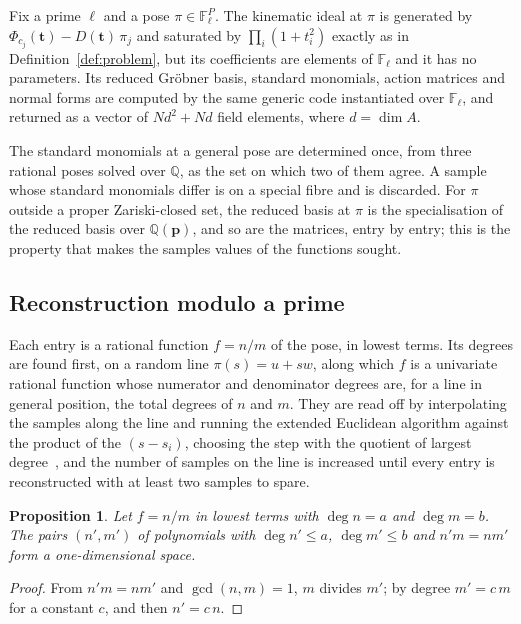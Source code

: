 \documentclass[11pt,a4paper]{article}
\theoremstyle{plain}
\newtheorem{proposition}{Proposition}
\theoremstyle{definition}
\theoremstyle{remark}
\newcommand{\FF}{\mathbb{F}}
\newcommand{\QQ}{\mathbb{Q}}
\newcommand{\bp}{\boldsymbol{p}}
\newcommand{\bt}{\boldsymbol{t}}
\begin{document}
Fix a prime $\ell$ and a pose $\pi \in \FF_\ell^P$. The kinematic ideal at $\pi$ is generated by
$\Phi_{c_j}(\bt) - D(\bt)\,\pi_j$ and saturated by $\prod_i(1+t_i^2)$ exactly as in
Definition~\ref{def:problem}, but its coefficients are elements of $\FF_\ell$ and it has no
parameters. Its reduced Gr\"obner basis, standard monomials, action matrices and normal forms are
computed by the same generic code instantiated over $\FF_\ell$, and returned as a vector of
$N d^2 + N d$ field elements, where $d = \dim A$.

The standard monomials at a general pose are determined once, from three rational poses solved over
$\QQ$, as the set on which two of them agree. A sample whose standard monomials differ is on a
special fibre and is discarded. For $\pi$ outside a proper Zariski-closed set, the reduced basis at
$\pi$ is the specialisation of the reduced basis over $\QQ(\bp)$, and so are the matrices, entry by
entry; this is the property that makes the samples values of the functions sought.

\subsection{Reconstruction modulo a prime}

Each entry is a rational function $f = n/m$ of the pose, in lowest terms. Its degrees are found first,
on a random line $\pi(s) = u + s w$, along which $f$ is a univariate rational function whose
numerator and denominator degrees are, for a line in general position, the total degrees of $n$ and
$m$. They are read off by interpolating the samples along the line and running the extended Euclidean
algorithm against the product of the $(s - s_i)$, choosing the step with the quotient of largest
degree~\cite{monagan2004}, and the number of samples on the line is increased until every entry is
reconstructed with at least two samples to spare.

\begin{proposition}
\label{prop:line}
Let $f = n/m$ in lowest terms with $\deg n = a$ and $\deg m = b$. The pairs $(n', m')$ of polynomials
with $\deg n' \le a$, $\deg m' \le b$ and $n' m = n m'$ form a one-dimensional space.
\end{proposition}

\begin{proof}
From $n' m = n m'$ and $\gcd(n,m) = 1$, $m$ divides $m'$; by degree $m' = c\,m$ for a constant $c$,
and then $n' = c\,n$.
\end{proof}
\end{document}

